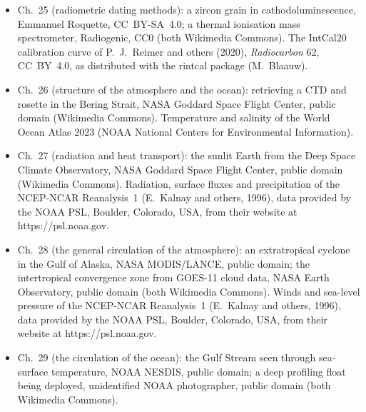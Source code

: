 \begin{itemize}
  \item Ch.~25 (radiometric dating methods): a zircon grain in cathodoluminescence, Emmanuel Roquette, CC~BY-SA~4.0; a thermal ionisation mass spectrometer, Radiogenic, CC0 (both Wikimedia Commons). The IntCal20 calibration curve of P.~J.~Reimer and others (2020), \emph{Radiocarbon} 62, CC~BY~4.0, as distributed with the rintcal package (M.~Blaauw).
  \item Ch.~26 (structure of the atmosphere and the ocean): retrieving a CTD and rosette in the Bering Strait, NASA Goddard Space Flight Center, public domain (Wikimedia Commons). Temperature and salinity of the World Ocean Atlas 2023 (NOAA National Centers for Environmental Information).
  \item Ch.~27 (radiation and heat transport): the sunlit Earth from the Deep Space Climate Observatory, NASA Goddard Space Flight Center, public domain (Wikimedia Commons). Radiation, surface fluxes and precipitation of the NCEP-NCAR Reanalysis~1 (E.~Kalnay and others, 1996), data provided by the NOAA PSL, Boulder, Colorado, USA, from their website at https://psl.noaa.gov.
  \item Ch.~28 (the general circulation of the atmosphere): an extratropical cyclone in the Gulf of Alaska, NASA MODIS/LANCE, public domain; the intertropical convergence zone from GOES-11 cloud data, NASA Earth Observatory, public domain (both Wikimedia Commons). Winds and sea-level pressure of the NCEP-NCAR Reanalysis~1 (E.~Kalnay and others, 1996), data provided by the NOAA PSL, Boulder, Colorado, USA, from their website at https://psl.noaa.gov.
  \item Ch.~29 (the circulation of the ocean): the Gulf Stream seen through sea-surface temperature, NOAA NESDIS, public domain; a deep profiling float being deployed, unidentified NOAA photographer, public domain (both Wikimedia Commons).
\end{itemize}
